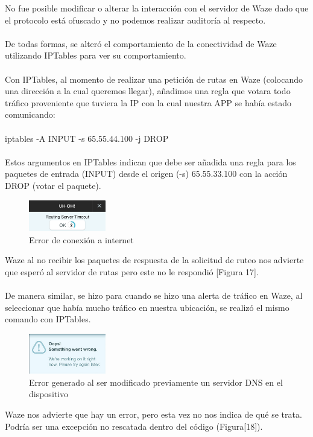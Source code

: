 No fue posible modificar o alterar la interacción con el servidor de Waze dado que el protocolo está ofuscado y no podemos realizar auditoría al respecto. 
\\\\
De todas formas, se alteró el comportamiento de la conectividad de Waze  utilizando IPTables para ver su comportamiento.
\\\\    
Con IPTables, al momento de realizar una petición de rutas en Waze (colocando una dirección a la cual queremos llegar), añadimos una regla que votara todo tráfico proveniente que tuviera la IP con la cual nuestra APP se había estado comunicando:
\\\\
iptables -A INPUT -s 65.55.44.100 -j DROP
\\\\
Estos argumentos en IPTables indican que debe ser añadida una regla para los paquetes de entrada (INPUT) desde el origen (-s) 65.55.33.100 con la acción DROP (votar el paquete).

            \begin{figure}[H]
  \begin{center}
    \includegraphics[width=0.3\textwidth]{imagenes/fig45.png}
    \caption{Error de conexión a internet}
  \end{center}
\end{figure}
    
    
Waze al no recibir los paquetes de respuesta de la solicitud de ruteo nos advierte que esperó al servidor de rutas pero este no le respondió [Figura 17].
\\\\
De manera similar, se hizo para cuando se hizo una alerta de tráfico en Waze, al seleccionar que había mucho tráfico en nuestra ubicación, se realizó el mismo comando con IPTables.

        \begin{figure}[H]
  \begin{center}
    \includegraphics[width=0.3\textwidth]{imagenes/fig46.png}
    \caption{Error generado al ser modificado previamente un servidor DNS en el dispositivo}
  \end{center}
\end{figure}


Waze nos advierte que hay un error, pero esta vez no nos indica de qué se trata. Podría ser una excepción no rescatada dentro del código (Figura[18]).
